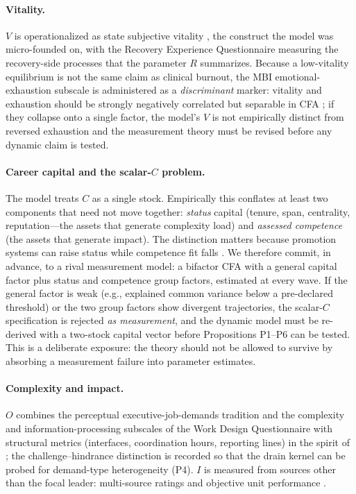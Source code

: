 \paragraph{Vitality.}
$V$ is operationalized as state subjective vitality
\citep{ryan1997subjective,ryan2000self}, the construct the model was
micro-founded on, with the Recovery Experience Questionnaire
\citep{sonnentag2007recovery} measuring the recovery-side processes that the
parameter $R$ summarizes. Because a low-vitality equilibrium is not the same
claim as clinical burnout, the MBI emotional-exhaustion subscale
\citep{maslach1981burnout,maslach2001job} is administered as a
\emph{discriminant} marker: vitality and exhaustion should be strongly
negatively correlated but separable in CFA
\citep{halbesleben2004burnout,alarcon2011meta}; if they collapse onto a
single factor, the model's $V$ is not empirically distinct from reversed
exhaustion and the measurement theory must be revised before any dynamic
claim is tested.

\paragraph{Career capital and the scalar-$C$ problem.}
The model treats $C$ as a single stock. Empirically this conflates at least
two components that need not move together: \emph{status} capital (tenure,
span, centrality, reputation---the assets that generate complexity load) and
\emph{assessed competence} (the assets that generate impact). The
distinction matters because promotion systems can raise status while
competence fit falls \citep{pluchino2010peter}. We therefore commit, in
advance, to a rival measurement model: a bifactor CFA
\citep{reise2012bifactor} with a general capital factor plus status and
competence group factors, estimated at every wave. If the general factor is weak (e.g., explained common variance below
a pre-declared threshold) or the two group factors show divergent
trajectories, the scalar-$C$ specification is rejected \emph{as
measurement}, and the dynamic model must be re-derived with a two-stock
capital vector before Propositions P1--P6 can be tested. This is a
deliberate exposure: the theory should not be allowed to survive by
absorbing a measurement failure into parameter estimates.

\paragraph{Complexity and impact.}
$O$ combines the perceptual executive-job-demands tradition
\citep{hambrick2005executive,zhu2022executive} and the complexity and
information-processing subscales of the Work Design Questionnaire
\citep{morgeson2006wdq,parker2017workdesign} with structural metrics
(interfaces, coordination hours, reporting lines) in the spirit of
\citet{garicano2000hierarchies}; the challenge--hindrance distinction
\citep{podsakoff2023challenge} is recorded so that the drain kernel can be
probed for demand-type heterogeneity (P4). $I$ is measured from sources
other than the focal leader: multi-source ratings and objective unit
performance \citep{hambrick2007upper,edmans2016executive}.

